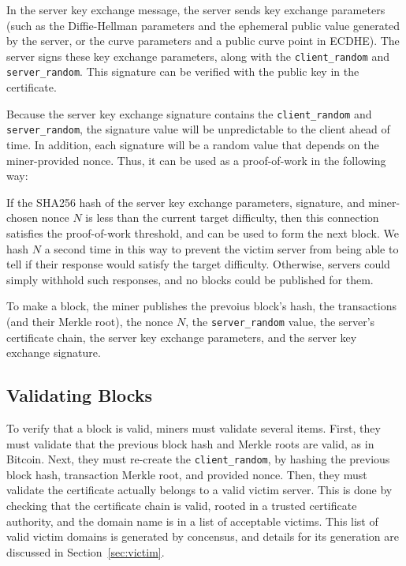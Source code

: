 In the server key exchange message, the server sends key exchange parameters
(such as the Diffie-Hellman parameters and the ephemeral public value generated
by the server, or the curve parameters and a public curve point in ECDHE). The
server signs these key exchange parameters, along with the
\texttt{client\_random} and \texttt{server\_random}. This signature can be
verified with the public key in the certificate.

Because the server key exchange signature contains the \texttt{client\_random}
and \texttt{server\_random}, the signature value will be unpredictable to the
client ahead of time. In addition, each signature will be a random value that
depends on the miner-provided nonce. Thus, it can be used as a proof-of-work in the
following way:

If the SHA256 hash of the server key exchange parameters, signature, and
miner-chosen nonce $N$ is less than the current target difficulty, then this
connection satisfies the proof-of-work threshold, and can be used to form the
next block. We hash $N$ a second time in this way to prevent the victim server
from being able to tell if their response would satisfy the target difficulty.
Otherwise, servers could simply withhold such responses, and no blocks could be
published for them.

To make a block, the miner publishes the prevoius block's hash, the transactions
(and their Merkle root), the nonce $N$, the \texttt{server\_random} value, the
server's certificate chain, the server key exchange parameters, and the server
key exchange signature.

\subsection{Validating Blocks}

To verify that a block is valid, miners must validate several items. First, they
must validate that the previous block hash and Merkle roots are valid, as in
Bitcoin. Next, they must re-create the \texttt{client\_random}, by hashing the
previous block hash, transaction Merkle root, and provided nonce. Then, they
must validate the certificate actually belongs to a valid victim server. This is
done by checking that the certificate chain is valid, rooted in a trusted
certificate authority, and the domain name is in a list of acceptable victims.
This list of valid victim domains is generated by concensus, and details for its
generation are discussed in Section~\ref{sec:victim}.

